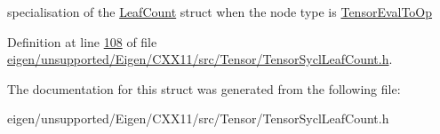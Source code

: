 specialisation of the \hyperlink{struct_eigen_1_1_tensor_sycl_1_1internal_1_1_leaf_count}{Leaf\+Count} struct when the node type is \hyperlink{class_eigen_1_1_tensor_eval_to_op}{Tensor\+Eval\+To\+Op} 

Definition at line \hyperlink{eigen_2unsupported_2_eigen_2_c_x_x11_2src_2_tensor_2_tensor_sycl_leaf_count_8h_source_l00108}{108} of file \hyperlink{eigen_2unsupported_2_eigen_2_c_x_x11_2src_2_tensor_2_tensor_sycl_leaf_count_8h_source}{eigen/unsupported/\+Eigen/\+C\+X\+X11/src/\+Tensor/\+Tensor\+Sycl\+Leaf\+Count.\+h}.



The documentation for this struct was generated from the following file\+:\begin{DoxyCompactItemize}
\item 
eigen/unsupported/\+Eigen/\+C\+X\+X11/src/\+Tensor/\+Tensor\+Sycl\+Leaf\+Count.\+h\end{DoxyCompactItemize}
